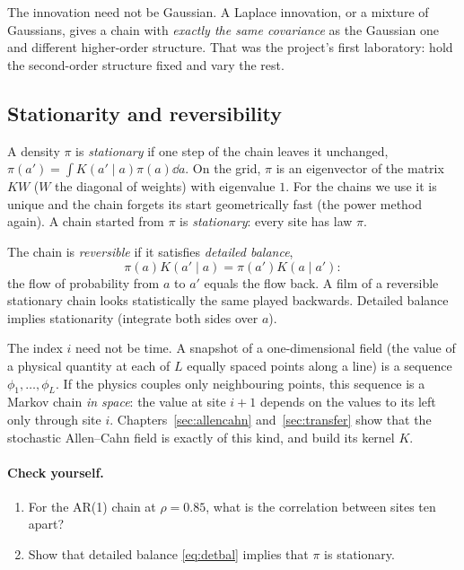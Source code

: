 The innovation need not be Gaussian. A Laplace innovation, or a mixture of Gaussians, gives a chain with
\emph{exactly the same covariance} as the Gaussian one and different higher-order structure. That was the
project's first laboratory: hold the second-order structure fixed and vary the rest.

\subsection{Stationarity and reversibility}

A density $\pi$ is \emph{stationary} if one step of the chain leaves it unchanged,
$\pi(a')=\int K(a'\mid a)\pi(a)\dd a$. On the grid, $\pi$ is an eigenvector of the matrix $KW$ ($W$ the diagonal
of weights) with eigenvalue $1$. For the chains we use it is unique and the chain forgets its start
geometrically fast (the power method again). A chain started from $\pi$ is \emph{stationary}: every site has
law $\pi$.

The chain is \emph{reversible} if it satisfies \emph{detailed balance},
\begin{equation}\label{eq:detbal}
  \pi(a)K(a'\mid a)=\pi(a')K(a\mid a'):
\end{equation}
the flow of probability from $a$ to $a'$ equals the flow back. A film of a reversible stationary chain looks
statistically the same played backwards. Detailed balance implies stationarity (integrate both sides over $a$).

\begin{inproject}
The index $i$ need not be time. A snapshot of a one-dimensional field (the value of a physical quantity at
each of $L$ equally spaced points along a line) is a sequence $\phi_1,\dots,\phi_L$. If the physics couples only
neighbouring points, this sequence is a Markov chain \emph{in space}: the value at site $i+1$ depends on the
values to its left only through site $i$. Chapters~\ref{sec:allencahn} and~\ref{sec:transfer} show that the
stochastic Allen--Cahn field is exactly of this kind, and build its kernel $K$.
\end{inproject}

\paragraph{Check yourself.}
\begin{enumerate}[label=\thesection.\arabic*,leftmargin=2.2em]
\item For the AR(1) chain at $\rho=0.85$, what is the correlation between sites ten apart?
\item Show that detailed balance \eqref{eq:detbal} implies that $\pi$ is stationary.
\end{enumerate}
